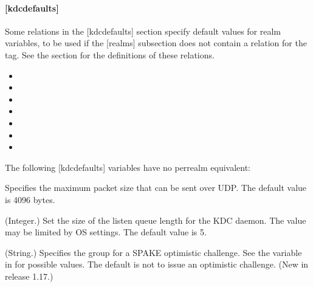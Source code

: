 \documentclass[letterpaper,10pt,english]{sphinxmanual}
\begin{document}
\paragraph{{[}kdcdefaults{]}}
\label{\detokenize{admin/conf_files/kdc_conf:kdcdefaults}}\label{\detokenize{admin/conf_files/kdc_conf:id1}}
\sphinxAtStartPar
Some relations in the {[}kdcdefaults{]} section specify default values for
realm variables, to be used if the {[}realms{]} subsection does not
contain a relation for the tag.  See the {\hyperref[\detokenize{admin/conf_files/kdc_conf:kdc-realms}]{}} section for
the definitions of these relations.
\begin{itemize}
\item {} 
\sphinxAtStartPar
{}

\item {} 
\sphinxAtStartPar
{}

\item {} 
\sphinxAtStartPar
{}

\item {} 
\sphinxAtStartPar
{}

\item {} 
\sphinxAtStartPar
{}

\item {} 
\sphinxAtStartPar
{}

\item {} 
\sphinxAtStartPar
{}

\end{itemize}

\sphinxAtStartPar
The following {[}kdcdefaults{]} variables have no per\sphinxhyphen{}realm equivalent:
\begin{description}
\sphinxAtStartPar
Specifies the maximum packet size that can be sent over UDP.  The
default value is 4096 bytes.

\sphinxAtStartPar
(Integer.)  Set the size of the listen queue length for the KDC
daemon.  The value may be limited by OS settings.  The default
value is 5.

\sphinxAtStartPar
(String.)  Specifies the group for a SPAKE optimistic challenge.
See the  variable in {\hyperref[\detokenize{admin/conf_files/krb5_conf:libdefaults}]{}}
for possible values.  The default is not to issue an optimistic
challenge.  (New in release 1.17.)

\end{description}
\end{document}
